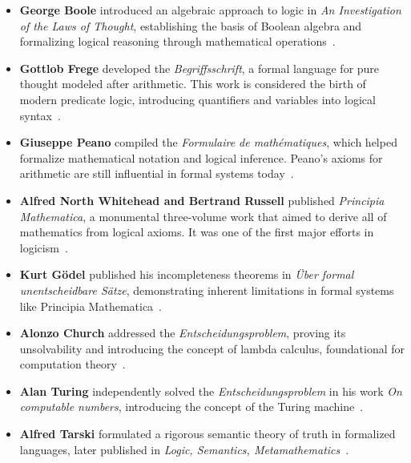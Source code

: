 \begin{itemize}
  \item \textbf{George Boole} introduced an algebraic approach to logic in \textit{An Investigation of the Laws of Thought}, establishing the basis of Boolean algebra and formalizing logical reasoning through mathematical operations~\cite{boole1854laws}.

  \item \textbf{Gottlob Frege} developed the \textit{Begriffsschrift}, a formal language for pure thought modeled after arithmetic. This work is considered the birth of modern predicate logic, introducing quantifiers and variables into logical syntax~\cite{frege1879begriffsschrift}.

  \item \textbf{Giuseppe Peano} compiled the \textit{Formulaire de mathématiques}, which helped formalize mathematical notation and logical inference. Peano's axioms for arithmetic are still influential in formal systems today~\cite{peano1895formulaire}.

  \item \textbf{Alfred North Whitehead and Bertrand Russell} published \textit{Principia Mathematica}, a monumental three-volume work that aimed to derive all of mathematics from logical axioms. It was one of the first major efforts in logicism~\cite{whitehead1910principia}.

  \item \textbf{Kurt Gödel} published his incompleteness theorems in \textit{Über formal unentscheidbare Sätze}, demonstrating inherent limitations in formal systems like Principia Mathematica~\cite{godel1931uber}.

  \item \textbf{Alonzo Church} addressed the \textit{Entscheidungsproblem}, proving its unsolvability and introducing the concept of lambda calculus, foundational for computation theory~\cite{church1936unsolvable}.

  \item \textbf{Alan Turing} independently solved the \textit{Entscheidungsproblem} in his work \textit{On computable numbers}, introducing the concept of the Turing machine~\cite{turing1936computable}.

  \item \textbf{Alfred Tarski} formulated a rigorous semantic theory of truth in formalized languages, later published in \textit{Logic, Semantics, Metamathematics}~\cite{tarski1935concept}.
\end{itemize}

